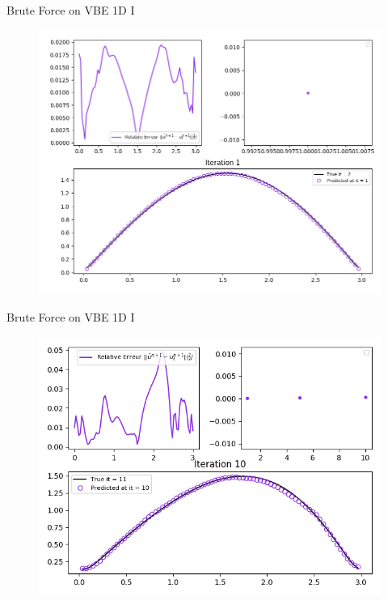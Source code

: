 \documentclass[10pt,
			   xcolor=svgnames,
			   hyperref={linkcolor=red, citecolor = DarkGreen, colorlinks=true, urlcolor=Navy}]{beamer}
\begin{document}
\begin{frame}{Brute Force on VBE 1D I}
	\begin{figure}[H]
	\centering
	\includegraphics[scale=0.4]{Pres_First_Iteration_1.png}
	\end{figure} 
\end{frame}

\begin{frame}{Brute Force on VBE 1D I}
	\begin{figure}[H]
	\centering
	\includegraphics[scale=0.5]{Pres_Tenth_Iteration_1.png}
	\end{figure} 
\end{frame}
\end{document}
